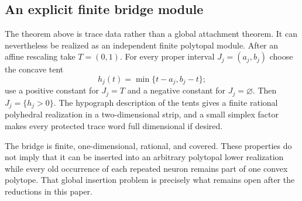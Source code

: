 \subsection{An explicit finite bridge module}

The theorem above is trace data rather than a global attachment theorem.  It can nevertheless be realized as an independent finite polytopal module.  After an affine rescaling take $T=(0,1)$.  For every proper interval $J_j=(a_j,b_j)$ choose the concave tent
\[
 h_j(t)=\min\{t-a_j,b_j-t\};
\]
use a positive constant for $J_j=T$ and a negative constant for $J_j=\varnothing$.  Then $J_j=\{h_j>0\}$.  The hypograph description of the tents gives a finite rational polyhedral realization in a two-dimensional strip, and a small simplex factor makes every protected trace word full dimensional if desired.

\begin{remark}
The bridge is finite, one-dimensional, rational, and covered.  These properties do not imply that it can be inserted into an arbitrary polytopal lower realization while every old occurrence of each repeated neuron remains part of one convex polytope.  That global insertion problem is precisely what remains open after the reductions in this paper.
\end{remark}
